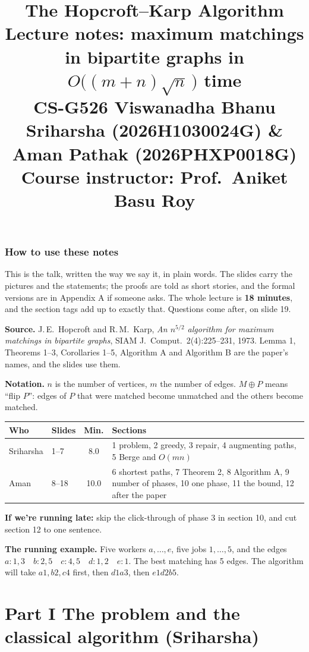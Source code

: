 \documentclass[11pt,a4paper]{article}
\title{\textbf{The Hopcroft--Karp Algorithm}\\[2pt]
\large Lecture notes: maximum matchings in bipartite graphs in $O\big((m+n)\sqrt n\,\big)$ time\\[2pt]
\normalsize CS-G526 \quad Viswanadha Bhanu Sriharsha (2026H1030024G) \& Aman Pathak (2026PHXP0018G)\\[2pt]
Course instructor: Prof.\ Aniket Basu Roy}
\author{}\date{}
\begin{document}
\maketitle

\section*{How to use these notes}
This is the talk, written the way we say it, in plain words. The slides carry the pictures and the statements; the proofs are told as short stories, and the formal versions are in Appendix A if someone asks. The whole lecture is \textbf{18 minutes}, and the section tags add up to exactly that. Questions come after, on slide 19.

\textbf{Source.} J.\,E.\ Hopcroft and R.\,M.\ Karp, \emph{An $n^{5/2}$ algorithm for maximum matchings in bipartite graphs}, SIAM J.\ Comput.\ 2(4):225--231, 1973. Lemma 1, Theorems 1--3, Corollaries 1--5, Algorithm A and Algorithm B are the paper's names, and the slides use them.

\textbf{Notation.} $n$ is the number of vertices, $m$ the number of edges. $M\oplus P$ means ``flip $P$'': edges of $P$ that were matched become unmatched and the others become matched.

\begin{center}
\begin{tabular}{llcp{8.8cm}}
\toprule
\textbf{Who} & \textbf{Slides} & \textbf{Min.} & \textbf{Sections}\\
\midrule
Sriharsha & 1--7  & 8.0  & 1 problem, 2 greedy, 3 repair, 4 augmenting paths, 5 Berge and $O(mn)$\\
Aman & 8--18 & 10.0 & 6 shortest paths, 7 Theorem 2, 8 Algorithm A, 9 number of phases, 10 one phase, 11 the bound, 12 after the paper\\
\bottomrule
\end{tabular}
\end{center}
\textbf{If we're running late:} skip the click-through of phase 3 in section 10, and cut section 12 to one sentence.

\textbf{The running example.} Five workers $a,\dots,e$, five jobs $1,\dots,5$, and the edges
$a\!:\!1,3\quad b\!:\!2,5\quad c\!:\!4,5\quad d\!:\!1,2\quad e\!:\!1$.
The best matching has 5 edges. The algorithm will take $a1,b2,c4$ first, then $d1a3$, then $e1d2b5$.

\part*{Part I \quad The problem and the classical algorithm \quad (Sriharsha)}
\end{document}
